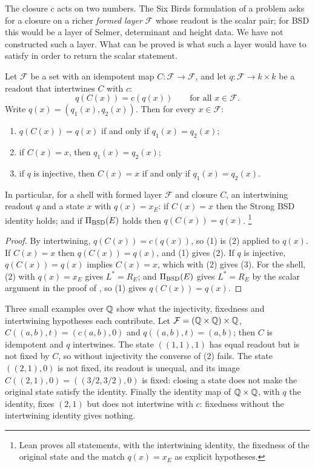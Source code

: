 The closure $c$ acts on two numbers.  The Six Birds formulation of a
problem asks for a closure on a richer \emph{formed layer} $\mathcal F$
whose readout is the scalar pair; for BSD this would be a layer of
Selmer, determinant and height data.  We have not constructed such a
layer.  What can be proved is what such a layer would have to satisfy in
order to return the scalar statement.

\begin{theorem}\label{thm:closure:formed-closure-bridge}
Let $\mathcal F$ be a set with an idempotent map $C:\mathcal F\to\mathcal
F$, and let $q:\mathcal F\to k\times k$ be a readout that intertwines $C$
with $c$:
\[
  q(C(x))=c(q(x))\qquad\text{for all }x\in\mathcal F .
\]
Write $q(x)=(q_1(x),q_2(x))$.  Then for every $x\in\mathcal F$:
\begin{enumerate}
\item $q(C(x))=q(x)$ if and only if $q_1(x)=q_2(x)$;
\item if $C(x)=x$, then $q_1(x)=q_2(x)$;
\item if $q$ is injective, then $C(x)=x$ if and only if $q_1(x)=q_2(x)$.
\end{enumerate}
In particular, for a shell with formed layer $\mathcal F$ and closure $C$,
an intertwining readout $q$ and a state $x$ with $q(x)=x_E$: if
$C(x)=x$ then the Strong BSD identity holds; and if $\Pi_{\mathrm{BSD}}(E)$ holds then
$q(C(x))=q(x)$.%
\footnote{Lean proves all statements, with the intertwining identity, the
fixedness of the original state and the match $q(x)=x_E$ as explicit
hypotheses.}
\end{theorem}

\begin{proof}
By intertwining, $q(C(x))=c(q(x))$, so (1) is
(2) applied to $q(x)$.  If
$C(x)=x$ then $q(C(x))=q(x)$, and (1) gives (2).  If $q$ is injective,
$q(C(x))=q(x)$ implies $C(x)=x$, which with (2) gives (3).  For the shell,
(2) with $q(x)=x_E$ gives $L^*=R_E$; and $\Pi_{\mathrm{BSD}}(E)$ gives $L^*=R_E$ by
the scalar argument in the proof of
, so (1) gives $q(C(x))=q(x)$.
\end{proof}

Three small examples over $\mathbb{Q}$ show what the injectivity, fixedness and
intertwining hypotheses each contribute.  Let
$\mathcal F=(\mathbb{Q}\times\mathbb{Q})\times\mathbb{Q}$, $C((a,b),t)=(c(a,b),0)$ and
$q((a,b),t)=(a,b)$; then $C$ is idempotent and $q$ intertwines.  The state
$((1,1),1)$ has equal readout but is not fixed by $C$, so without
injectivity the converse of (2) fails.  The state $((2,1),0)$ is not
fixed, its readout is unequal, and its image $C((2,1),0)=((3/2,3/2),0)$
is fixed: closing a state does not make the original state satisfy the
identity.  Finally the identity map of $\mathbb{Q}\times\mathbb{Q}$, with $q$ the
identity, fixes $(2,1)$ but does not intertwine with $c$: fixedness
without the intertwining identity gives nothing.

